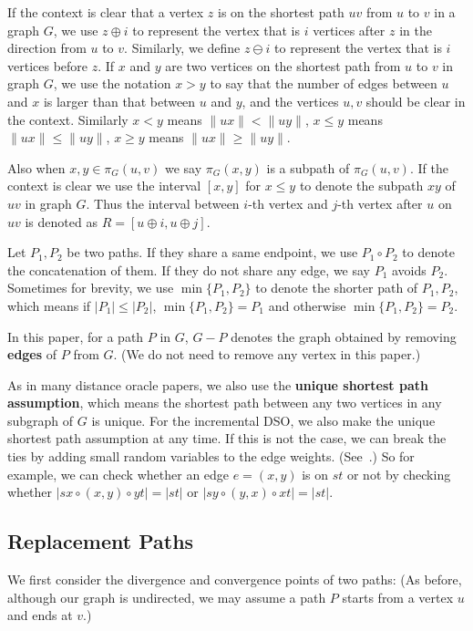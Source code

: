 \documentclass[11pt]{article}
\theoremstyle{plain}
\theoremstyle{definition}
\newcommand{\abs}[1]{\vert{#1}\vert}
\begin{document}
If the context is clear that a vertex $z$ is on the shortest path $uv$ from $u$ to $v$ in a graph $G$, we use $z \oplus i$ to represent the vertex that is $i$ vertices after $z$ in the direction from $u$ to $v$. Similarly, we define $z \ominus i$ to represent the vertex that is $i$ vertices before $z$. If $x$ and $y$ are two vertices on the shortest path from $u$ to $v$ in graph $G$, we use the notation $x>y$ to say that the number of edges between $u$ and $x$ is larger than that between $u$ and $y$, and the vertices $u,v$ should be clear in the context. Similarly $x<y$ means $\|ux\|<\|uy\|$, $x\le y$ means $\|ux\|\le\|uy\|$, $x\ge y$ means $\|ux\|\ge\|uy\|$. 

Also when $x,y\in \pi_G(u,v)$ we say $\pi_G(x,y)$ is a subpath of $\pi_G(u,v)$. If the context is clear we use the interval $[x,y]$ for $x\leq y$ to denote the subpath $xy$ of $uv$ in graph $G$. 
Thus the interval between $i$-th vertex and $j$-th vertex after $u$ on $uv$ is denoted as $R=[u \oplus i, u\oplus j]$.




Let $P_1,P_2$ be two paths. If they share a same endpoint, we use $P_1\circ P_2$ to denote the concatenation of them. If they do not share any edge, we say $P_1$ avoids $P_2.$ Sometimes for brevity, we use $\min\{P_1,P_2\}$ to denote the shorter path of $P_1,P_2$, which means if $\abs{P_1}\le \abs{P_2}$, $\min\{P_1,P_2\}=P_1$  and otherwise $\min\{P_1,P_2\}=P_2$.

In this paper, for a path $P$ in $G$, $G-P$ denotes the graph obtained by removing \textbf{edges} of $P$ from $G$. (We do not need to remove any vertex in this paper.)


As in many distance oracle papers, we also use the \textbf{unique shortest path assumption}, which means the shortest path between any two vertices in any subgraph of $G$ is unique. For the incremental DSO, we also make the unique shortest path assumption at any time. If this is not the case, we can break the ties by adding small random variables to the edge weights. (See~\cite{DI04}.) So for example, we can check whether an edge $e=(x,y)$ is on $st$ or not by checking whether $|sx\circ (x,y)\circ yt|=|st|$ or $|sy\circ (y,x)\circ xt|=|st|$.



\subsection{Replacement Paths}

We first consider the divergence and convergence points of two paths: (As before, although our graph is undirected, we may assume a path $P$ starts from a vertex $u$ and ends at $v$.)
\end{document}
